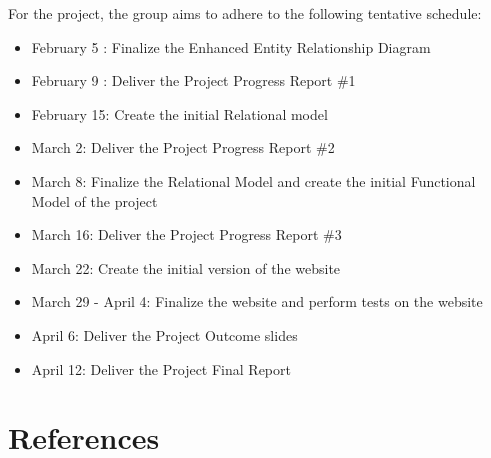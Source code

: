 \documentclass[letterpaper,12pt]{article}
\begin{document}
For the project, the group aims to adhere to the following tentative schedule:
\begin{itemize}
	\item February 5 : Finalize the Enhanced Entity Relationship Diagram
	\item February 9 : Deliver the Project Progress Report \#1
	\item February 15: Create the initial Relational model
	\item March 2: Deliver the Project Progress Report \#2
	\item March 8: Finalize the Relational Model and create the initial Functional Model of the project 
	\item March 16: Deliver the Project Progress Report \#3
	\item March 22: Create the initial version of the website
	\item March 29 - April 4: Finalize the website and perform tests on the website
	\item April 6: Deliver the Project Outcome slides
	\item April 12: Deliver the Project Final Report
\end{itemize}


\section{References}
\end{document}
